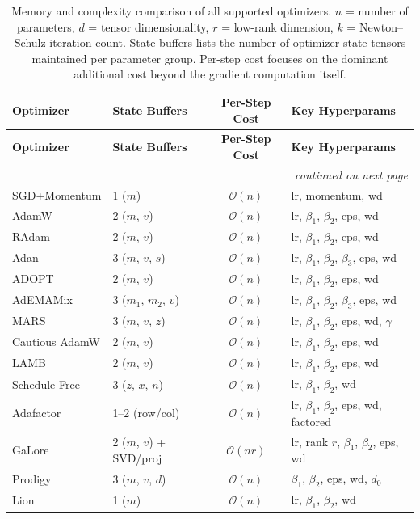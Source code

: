 \documentclass[11pt,a4paper]{article}
\begin{document}
\begin{longtable}{llcl}
\toprule
\textbf{Optimizer} & \textbf{State Buffers} & \textbf{Per-Step Cost} & \textbf{Key Hyperparams} \\
\midrule
\endfirsthead
\toprule
\textbf{Optimizer} & \textbf{State Buffers} & \textbf{Per-Step Cost} & \textbf{Key Hyperparams} \\
\midrule
\endhead
\midrule
\multicolumn{4}{r}{\textit{continued on next page}} \\
\endfoot
\bottomrule
\caption{Memory and complexity comparison of all supported optimizers. $n$ = number of parameters, $d$ = tensor dimensionality, $r$ = low-rank dimension, $k$ = Newton--Schulz iteration count. State buffers lists the number of optimizer state tensors maintained per parameter group. Per-step cost focuses on the dominant additional cost beyond the gradient computation itself.}
\label{tab:optimizer-complexity}
\endlastfoot
SGD+Momentum & 1 ($m$) & $\mathcal{O}(n)$ & lr, momentum, wd \\
AdamW & 2 ($m$, $v$) & $\mathcal{O}(n)$ & lr, $\beta_1$, $\beta_2$, eps, wd \\
RAdam & 2 ($m$, $v$) & $\mathcal{O}(n)$ & lr, $\beta_1$, $\beta_2$, eps, wd \\
Adan & 3 ($m$, $v$, $s$) & $\mathcal{O}(n)$ & lr, $\beta_1$, $\beta_2$, $\beta_3$, eps, wd \\
ADOPT & 2 ($m$, $v$) & $\mathcal{O}(n)$ & lr, $\beta_1$, $\beta_2$, eps, wd \\
AdEMAMix & 3 ($m_1$, $m_2$, $v$) & $\mathcal{O}(n)$ & lr, $\beta_1$, $\beta_2$, $\beta_3$, eps, wd \\
MARS & 3 ($m$, $v$, $z$) & $\mathcal{O}(n)$ & lr, $\beta_1$, $\beta_2$, eps, wd, $\gamma$ \\
Cautious AdamW & 2 ($m$, $v$) & $\mathcal{O}(n)$ & lr, $\beta_1$, $\beta_2$, eps, wd \\
LAMB & 2 ($m$, $v$) & $\mathcal{O}(n)$ & lr, $\beta_1$, $\beta_2$, eps, wd \\
Schedule-Free & 3 ($z$, $x$, $n$) & $\mathcal{O}(n)$ & lr, $\beta_1$, $\beta_2$, wd \\
Adafactor & 1--2 (row/col) & $\mathcal{O}(n)$ & lr, $\beta_1$, $\beta_2$, eps, wd, factored \\
GaLore & 2 ($m$, $v$) + SVD/proj & $\mathcal{O}(nr)$ & lr, rank $r$, $\beta_1$, $\beta_2$, eps, wd \\
Prodigy & 3 ($m$, $v$, $d$) & $\mathcal{O}(n)$ & $\beta_1$, $\beta_2$, eps, wd, $d_0$ \\
Lion & 1 ($m$) & $\mathcal{O}(n)$ & lr, $\beta_1$, $\beta_2$, wd \\

\end{longtable}
\end{document}
